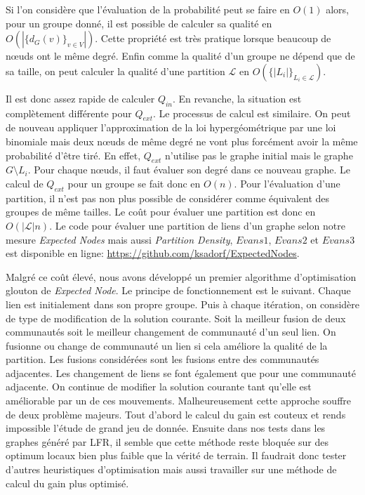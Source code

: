 Si l'on considère que l'évaluation de la probabilité peut se faire en $O(1)$ alors, pour un groupe donné, il est possible de calculer sa qualité en $O(|\{d_G(v)\}_{v \in V}|)$.
Cette propriété est très pratique lorsque beaucoup de n\oe uds ont le même degré.
Enfin comme la qualité d'un groupe ne dépend que de sa taille, on peut calculer la qualité d'une partition $\mathcal{L}$ en $O(\{|L_i|\}_{L_i \in \mathcal{L}})$.

Il est donc assez rapide de calculer $Q_{in}$.
En revanche, la situation est complètement différente pour $Q_{ext}$.
Le processus de calcul est similaire.
On peut de nouveau appliquer l'approximation de la loi hypergéométrique par une loi binomiale mais deux n\oe uds de même degré ne vont plus forcément avoir la même probabilité d'être tiré.
En effet, $Q_{ext}$ n'utilise pas le graphe initial mais le graphe $G\setminus L_i$.
Pour chaque n\oe uds, il faut évaluer son degré dans ce nouveau graphe.
Le calcul de $Q_{ext}$ pour un groupe se fait donc en $O(n)$.
Pour l'évaluation d'une partition, il n'est pas non plus possible de considérer comme équivalent des groupes de même tailles.
Le coût pour évaluer une partition est donc en $O(|\mathcal{L}|n)$.
Le code pour évaluer une partition de liens d'un graphe selon notre mesure \emph{Expected Nodes} mais aussi \emph{Partition Density}, $Evans1$, $Evans2$ et $Evans3$ est disponible en ligne: \url{https://github.com/ksadorf/ExpectedNodes}.


Malgré ce coût élevé, nous avons développé un premier algorithme d'optimisation glouton de \emph{Expected Node}.
Le principe de fonctionnement est le suivant.
Chaque lien est initialement dans son propre groupe.
Puis à chaque itération, on considère de type de modification de la solution courante.
Soit la meilleur fusion de deux communautés soit le meilleur changement de communauté d'un seul lien.
On fusionne ou change de communauté un lien si cela améliore la qualité de la partition.
Les fusions considérées sont les fusions entre des communautés adjacentes.
Les changement de liens se font également que pour une communauté adjacente.
On continue de modifier la solution courante tant qu'elle est améliorable par un de ces mouvements.
Malheureusement cette approche souffre de deux problème majeurs.
Tout d'abord le calcul du gain est couteux et rends impossible l'étude de grand jeu de donnée.
Ensuite dans nos tests dans les graphes généré par LFR, il semble que cette méthode reste bloquée sur des optimum locaux bien plus faible que la vérité de terrain.
Il faudrait donc tester d'autres heuristiques d'optimisation mais aussi travailler sur une méthode de calcul du gain plus optimisé.

